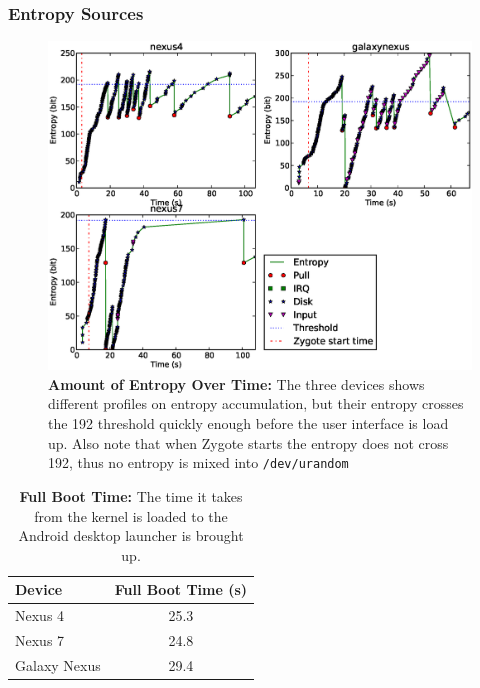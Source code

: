 \subsubsection{Entropy Sources}
\begin{figure}[t]
\begin{center}
\includegraphics[scale=0.6]{entropy.eps}
\end{center}
\caption{{\bf Amount of Entropy Over Time:} The three devices shows different profiles on entropy accumulation, but their entropy crosses the 192 threshold quickly enough before the user interface is load up. Also note that when Zygote starts the entropy does not cross 192, thus no entropy is mixed into \texttt{/dev/urandom}   }
\label{figentropy}
\end{figure}

\begin{table}
\begin{center}
\begin{tabular}{|l|c|}
\hline
\bf Device & \bf Full Boot Time (s) \\
\hline
Nexus 4 & 25.3 \\
\hline
Nexus 7 & 24.8 \\
\hline
Galaxy Nexus & 29.4 \\
\hline

\end{tabular}
\end{center}
\caption{{\bf Full Boot Time:} The time it takes from the kernel is loaded to the Android desktop launcher is brought up.}
\label{tblboottime}
\end{table}

